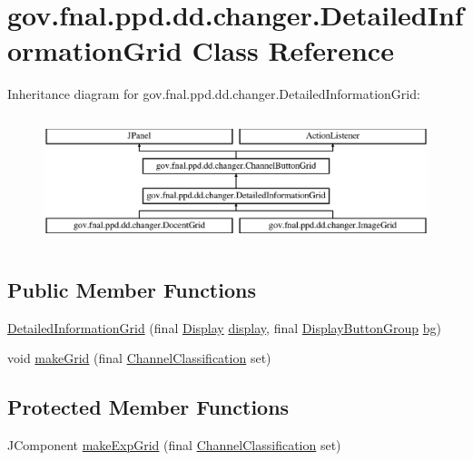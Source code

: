 \hypertarget{classgov_1_1fnal_1_1ppd_1_1dd_1_1changer_1_1DetailedInformationGrid}{\section{gov.\-fnal.\-ppd.\-dd.\-changer.\-Detailed\-Information\-Grid Class Reference}
\label{classgov_1_1fnal_1_1ppd_1_1dd_1_1changer_1_1DetailedInformationGrid}
}
Inheritance diagram for gov.\-fnal.\-ppd.\-dd.\-changer.\-Detailed\-Information\-Grid\-:\begin{figure}[H]
\begin{center}
\leavevmode
\includegraphics[height=3.783784cm]{classgov_1_1fnal_1_1ppd_1_1dd_1_1changer_1_1DetailedInformationGrid}
\end{center}
\end{figure}
\subsection*{Public Member Functions}
\begin{DoxyCompactItemize}
\item 
\hyperlink{classgov_1_1fnal_1_1ppd_1_1dd_1_1changer_1_1DetailedInformationGrid_ab24503e5e35e12bd5b9a597ce745b693}{Detailed\-Information\-Grid} (final \hyperlink{interfacegov_1_1fnal_1_1ppd_1_1dd_1_1signage_1_1Display}{Display} \hyperlink{classgov_1_1fnal_1_1ppd_1_1dd_1_1changer_1_1ChannelButtonGrid_a3c06b51489dcaacd16f6efcefe06bcaa}{display}, final \hyperlink{classgov_1_1fnal_1_1ppd_1_1dd_1_1util_1_1DisplayButtonGroup}{Display\-Button\-Group} \hyperlink{classgov_1_1fnal_1_1ppd_1_1dd_1_1changer_1_1ChannelButtonGrid_adf258a89161282e5215b4642ecbec812}{bg})
\item 
void \hyperlink{classgov_1_1fnal_1_1ppd_1_1dd_1_1changer_1_1DetailedInformationGrid_a5bd425b13017a5bb4ca36f663d2f966f}{make\-Grid} (final \hyperlink{classgov_1_1fnal_1_1ppd_1_1dd_1_1changer_1_1ChannelClassification}{Channel\-Classification} set)
\end{DoxyCompactItemize}
\subsection*{Protected Member Functions}
\begin{DoxyCompactItemize}
\item 
J\-Component \hyperlink{classgov_1_1fnal_1_1ppd_1_1dd_1_1changer_1_1DetailedInformationGrid_ab76f38e7452fe7c82d24cfba6f95b7aa}{make\-Exp\-Grid} (final \hyperlink{classgov_1_1fnal_1_1ppd_1_1dd_1_1changer_1_1ChannelClassification}{Channel\-Classification} set)
\end{DoxyCompactItemize}
